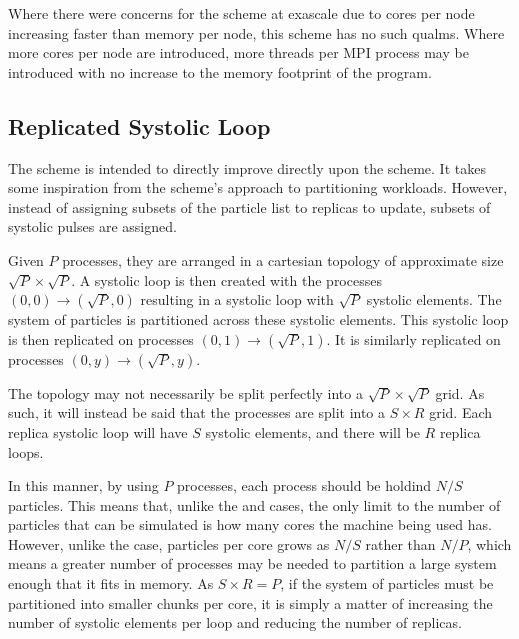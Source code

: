 Where there were concerns for the \replicateddata{} scheme at exascale
due to cores per node increasing faster than memory per node,
this scheme has no such qualms.
%
Where more cores per node are introduced,
more \openmp{} threads per MPI process
may be introduced with no increase to
the memory footprint of the program.



\subsection{Replicated Systolic Loop}

%
The \replicatedsystolicloop{} scheme is intended to directly improve directly
upon the \systolicloop{} scheme.
%
It takes some inspiration from the \replicateddata{} scheme's approach
to partitioning workloads.
%
However, instead of assigning subsets of the particle list to replicas
to update, subsets of systolic pulses are assigned.

Given $P$ processes, they are arranged in a cartesian topology of
approximate size $\sqrt{P} \times{} \sqrt{P}$.
%
A systolic loop is then created with the processes
$(0,0) \rightarrow{} (\sqrt{P}, 0)$
resulting in a systolic loop with $\sqrt{P}$ systolic elements.
%
The system of particles is partitioned across these systolic elements.
%
This systolic loop is then replicated on processes
$(0,1) \rightarrow{} (\sqrt{P}, 1)$.
%
It is similarly replicated on processes $(0,y) \rightarrow{} (\sqrt{P},y)$.

The topology may not necessarily be split perfectly into a
$\sqrt{P} \times{} \sqrt{P}$ grid.
%
As such, it will instead be said that the processes are split into a
$S \times{} R$ grid.
%
Each replica systolic loop will have $S$ systolic elements,
and there will be $R$ replica loops.


In this manner, by using $P$ processes, each process should be holdind
$N/S$ particles.
%
This means that, unlike the \replicateddata{} and \sharedandreplicateddata{}
cases, the only limit to the number of particles that can be simulated
is how many cores the machine being used has.
%
However, unlike the \systolicloop{} case, particles per core grows as
$N/S$ rather than $N/P$, which means a greater number of processes
may be needed to partition a large system enough that it fits in memory.
%
As $S \times{} R = P$,
if the system of particles must be partitioned into
smaller chunks per core,
it is simply a matter of
increasing the number of systolic elements per loop and
reducing the number of replicas.

